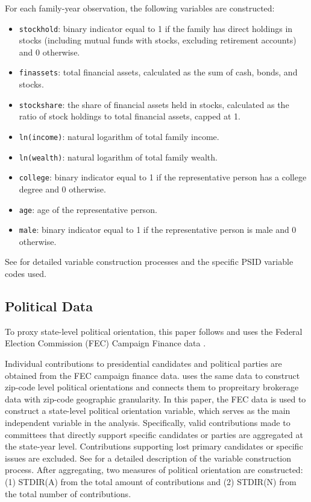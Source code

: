 For each family-year observation, the following variables are constructed:
\begin{itemize}
    \item \texttt{stockhold}: binary indicator equal to 1 if the family has direct holdings in stocks (including mutual funds with stocks, excluding retirement accounts) and 0 otherwise.
    \item \texttt{finassets}: total financial assets, calculated as the sum of cash, bonds, and stocks.
    \item \texttt{stockshare}: the share of financial assets held in stocks, calculated as the ratio of stock holdings to total financial assets, capped at 1.
    \item \texttt{ln(income)}: natural logarithm of total family income.    
    \item \texttt{ln(wealth)}: natural logarithm of total family wealth.
    \item \texttt{college}: binary indicator equal to 1 if the representative person has a college degree and 0 otherwise.
    \item \texttt{age}: age of the representative person.
    \item \texttt{male}: binary indicator equal to 1 if the representative person is male and 0 otherwise.
\end{itemize}
See  for detailed variable construction processes and the specific PSID variable codes used.


\subsection{Political Data}
\label{sec:data_political}

To proxy state-level political orientation, this paper follows \citet{meeuwis2022} and uses the Federal Election Commission (FEC) Campaign Finance data \citep{FEC2024}.

Individual contributions to presidential candidates and political parties are obtained from the FEC campaign finance data. \citet{meeuwis2022} uses the same data to construct zip-code level political orientations and connects them to propreitary brokerage data with zip-code geographic granularity. In this paper, the FEC data is used to construct a state-level political orientation variable, which serves as the main independent variable in the analysis. Specifically, valid contributions made to committees that directly support specific candidates or parties are aggregated at the state-year level. Contributions supporting lost primary candidates or specific issues are excluded. See  for a detailed description of the variable construction process. After aggregating, two measures of political orientation are constructed: (1) STDIR(A) from the total amount of contributions and (2) STDIR(N) from the total number of contributions.

